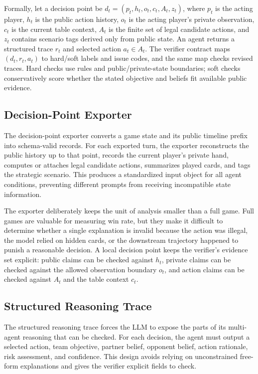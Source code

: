 \documentclass[sigconf,anonymous,review]{acmart}
\begin{document}
Formally, let a decision point be \(d_t = (p_t, h_t, o_t, c_t, A_t, z_t)\), where \(p_t\) is the acting player, \(h_t\) is the public action history, \(o_t\) is the acting player's private observation, \(c_t\) is the current table context, \(A_t\) is the finite set of legal candidate actions, and \(z_t\) contains scenario tags derived only from public state. An agent returns a structured trace \(r_t\) and selected action \(a_t \in A_t\). The verifier contract maps \((d_t, r_t, a_t)\) to hard/soft labels and issue codes, and the same map checks revised traces. Hard checks use rules and public/private-state boundaries; soft checks conservatively score whether the stated objective and beliefs fit available public evidence.

\subsection{Decision-Point Exporter}

The decision-point exporter converts a game state and its public timeline prefix into schema-valid records. For each exported turn, the exporter reconstructs the public history up to that point, records the current player's private hand, computes or attaches legal candidate actions, summarizes played cards, and tags the strategic scenario. This produces a standardized input object for all agent conditions, preventing different prompts from receiving incompatible state information.

The exporter deliberately keeps the unit of analysis smaller than a full game. Full games are valuable for measuring win rate, but they make it difficult to determine whether a single explanation is invalid because the action was illegal, the model relied on hidden cards, or the downstream trajectory happened to punish a reasonable decision. A local decision point keeps the verifier's evidence set explicit: public claims can be checked against \(h_t\), private claims can be checked against the allowed observation boundary \(o_t\), and action claims can be checked against \(A_t\) and the table context \(c_t\).

\subsection{Structured Reasoning Trace}

The structured reasoning trace forces the LLM to expose the parts of its multi-agent reasoning that can be checked. For each decision, the agent must output a selected action, team objective, partner belief, opponent belief, action rationale, risk assessment, and confidence. This design avoids relying on unconstrained free-form explanations and gives the verifier explicit fields to check.
\end{document}
